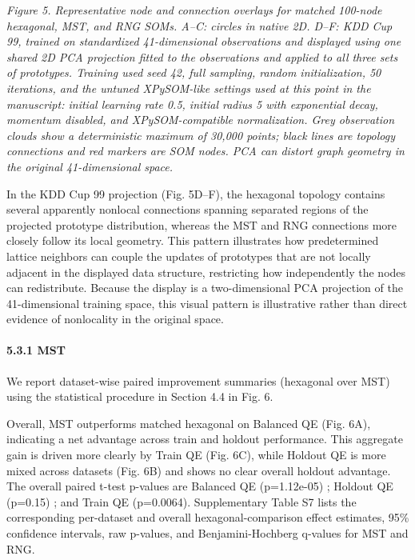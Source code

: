 \documentclass[
]{article}
\makeatletter
\newcommand*\pandocbounded[1]{%
  \sbox\pandoc@box{#1}%
  \Gscale@div\@tempa{\textheight}{\dimexpr\ht\pandoc@box+\dp\pandoc@box\relax}%
  \Gscale@div\@tempb{\linewidth}{\wd\pandoc@box}%
  \ifdim\@tempb\p@<\@tempa\p@\let\@tempa\@tempb\fi%
  \ifdim\@tempa\p@<\p@\scalebox{\@tempa}{\usebox\pandoc@box}%
  \else\usebox{\pandoc@box}%
  \fi%
}
\providecommand{\DIFadd}[1]{{\protect\color{blue} #1}} %
\providecommand{\DIFaddbegin}{} %
\providecommand{\DIFaddend}{} %
\makeatother
\begin{document}
\pandocbounded{}
\emph{Figure 5. Representative  node and connection overlays for  \DIFaddbegin \DIFadd{matched
100-node }\DIFaddend hexagonal, MST, and RNG  \DIFaddbegin \DIFadd{SOMs. A--C: circles in native 2D. D--F:
KDD Cup 99, trained }\DIFaddend on \DIFaddbegin \DIFadd{standardized 41-dimensional observations and
displayed using one shared 2D PCA projection fitted to the observations
and applied to all three sets of prototypes. Training used seed 42, full
sampling, random initialization, 50 iterations, and the untuned
XPySOM-like settings used at this point in the manuscript: initial
learning rate 0.5, initial radius 5 with exponential decay, momentum
disabled, and XPySOM-compatible normalization. Grey observation clouds
show }\DIFaddend a \DIFaddbegin \DIFadd{deterministic maximum of }\DIFaddend 30,000  \DIFaddbegin \DIFadd{points; black lines are topology
connections and red markers are SOM nodes}\DIFaddend . \DIFaddbegin \DIFadd{PCA can distort graph
geometry in the original 41-dimensional space.}\DIFaddend }

\DIFaddbegin \DIFadd{In the KDD Cup 99 projection (Fig. 5D--F), the hexagonal topology
contains several apparently nonlocal connections spanning separated
regions of the projected prototype distribution, whereas the MST and RNG
connections more closely follow its local geometry. This pattern
illustrates how predetermined lattice neighbors can couple the updates
of prototypes that are not locally adjacent in the displayed data
structure, restricting how independently the nodes can redistribute.
Because the display is a two-dimensional PCA projection of the
41-dimensional training space, this visual pattern is illustrative
rather than direct evidence of nonlocality in the original space.
}

\DIFaddend \paragraph{5.3.1 MST}\label{mst}

We report dataset-wise paired improvement summaries (hexagonal over MST)
 \DIFaddbegin \DIFadd{using the statistical procedure in Section 4.4 }\DIFaddend in Fig. 6.

Overall, MST outperforms matched hexagonal on  \DIFaddbegin \DIFadd{Balanced }\DIFaddend QE (Fig. 6A),
indicating a net advantage across train and holdout performance. This
aggregate gain is driven more clearly by  \DIFaddbegin \DIFadd{Train }\DIFaddend QE (Fig. 6C), while
 \DIFaddbegin \DIFadd{Holdout }\DIFaddend QE is more mixed across datasets (Fig. 6B) and shows no clear
overall holdout advantage. The overall paired t-test p-values are
 \DIFaddbegin \DIFadd{Balanced }\DIFaddend QE (p=1.12e-05) \DIFaddbegin \DIFadd{; Holdout }\DIFaddend QE (p=0.15) \DIFaddbegin \DIFadd{; and Train }\DIFaddend QE (p=0.0064).
\DIFaddbegin \DIFadd{Supplementary Table S7 lists the corresponding per-dataset and overall
hexagonal-comparison effect estimates, 95\% confidence intervals, raw
p-values, and Benjamini-Hochberg q-values for MST and RNG.
}\DIFaddend
\end{document}
